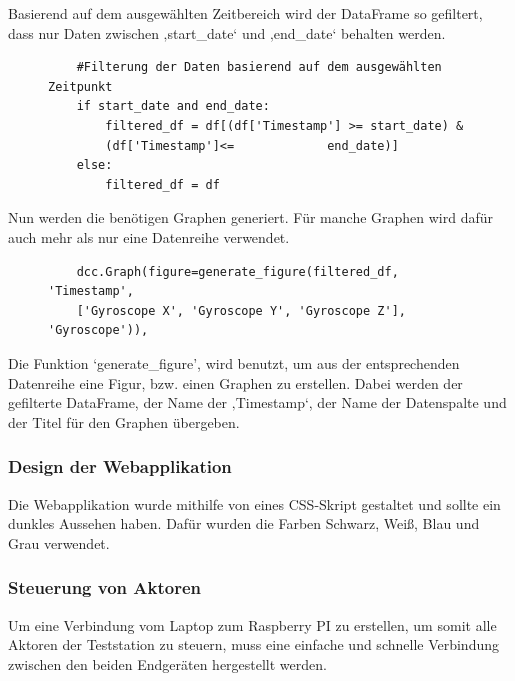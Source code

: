 Basierend auf dem ausgewählten Zeitbereich wird der DataFrame so gefiltert, dass nur Daten zwischen ‚start\_date‘ und ‚end\_date‘ behalten werden.\\
\vspace{3mm}
\begin{figure}[H]
    \centering
    \begin{verbatim}
    #Filterung der Daten basierend auf dem ausgewählten Zeitpunkt
    if start_date and end_date:
        filtered_df = df[(df['Timestamp'] >= start_date) & 
        (df['Timestamp']<=             end_date)]
    else:
        filtered_df = df

    \end{verbatim}
\end{figure}
Nun werden die benötigen Graphen generiert. Für manche Graphen wird dafür auch mehr als nur eine Datenreihe verwendet. 
\vspace{3mm}
\begin{figure}[H]
    \centering
    \begin{verbatim}
    dcc.Graph(figure=generate_figure(filtered_df, 'Timestamp', 
    ['Gyroscope X', 'Gyroscope Y', 'Gyroscope Z'], 'Gyroscope')),
    \end{verbatim}
\end{figure}
Die Funktion ‘generate\_figure’, wird benutzt, um aus der entsprechenden Datenreihe eine Figur, bzw. einen Graphen zu erstellen. Dabei werden der gefilterte DataFrame, der Name der ‚Timestamp‘, der Name der Datenspalte und der Titel für den Graphen übergeben.
\subsubsection{Design der Webapplikation }
Die Webapplikation wurde mithilfe von eines CSS-Skript gestaltet und sollte ein dunkles Aussehen haben. Dafür wurden die Farben Schwarz, Weiß, Blau und Grau verwendet. 

\subsubsection{Steuerung von Aktoren}
Um eine Verbindung vom Laptop zum Raspberry PI zu erstellen, um somit alle Aktoren der Teststation zu steuern, muss eine einfache und schnelle Verbindung zwischen den beiden Endgeräten hergestellt werden. 

